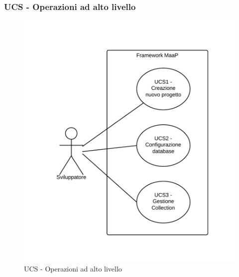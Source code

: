 \subsubsection{UCS - Operazioni ad alto livello} 
    \begin{center}
    \begin{figure}[H]
      \includegraphics[scale=0.16]{UML/UCS - Operazioni ad alto livello.png}
      \caption{UCS - Operazioni ad alto livello} 
    \end{figure}
    \end{center}
    
